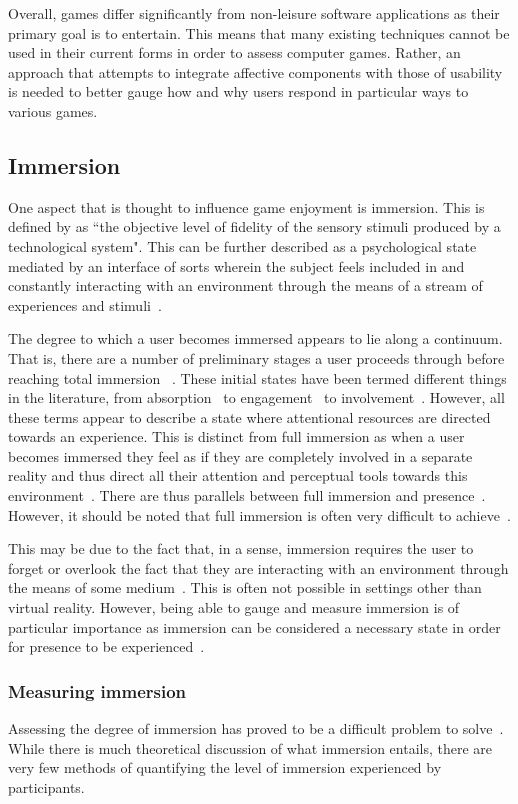 Overall, games differ significantly from non-leisure software applications as their primary goal is to entertain. This means that many existing techniques cannot be used in their current forms in order to assess computer games. Rather, an approach that attempts to integrate affective components with those of usability is needed to better gauge how and why users respond in particular ways to various games.

\subsection {Immersion}
One aspect that is thought to influence game enjoyment is immersion. This is defined by \citet{McMa06} as ``the objective level of fidelity of the sensory stimuli produced by a technological system". This can be further described as a psychological state mediated by an interface of sorts wherein the subject feels included in and constantly interacting with an environment through the means of a stream of experiences and stimuli~\citep{Witm98}.

The degree to which a user becomes immersed appears to lie along a continuum. That is, there are a number of preliminary stages a user proceeds through before reaching total immersion ~\citep{Brow04}. These initial states have been termed different things in the literature, from absorption~\citep{Ermi05} to engagement~\citep{Brow04} to involvement~\citep{Witm98}. However, all these terms appear to describe a state where attentional resources are directed towards an experience. This is distinct from full immersion as when a user becomes immersed they feel as if they are completely involved in a separate reality and thus direct all their attention and perceptual tools towards this environment~\citep{Ermi05}. There are thus parallels between full immersion and presence~\citep{Brow04}. However, it should be noted that full immersion is often very difficult to achieve~\citep{Witm98}.

This may be due to the fact that, in a sense, immersion requires the user to forget or overlook the fact that they are interacting with an environment through the means of some medium~\citep{Fede02}. This is often not possible in settings other than virtual reality. However, being able to gauge and measure immersion is of particular importance as immersion can be considered a necessary state in order for presence to be experienced~\citep{Brow04}. 

\subsubsection{Measuring immersion}
Assessing the degree of immersion has proved to be a difficult problem to solve~\citep{McMa06}. While there is much theoretical discussion of what immersion entails, there are very few methods of quantifying the level of immersion experienced by participants.

